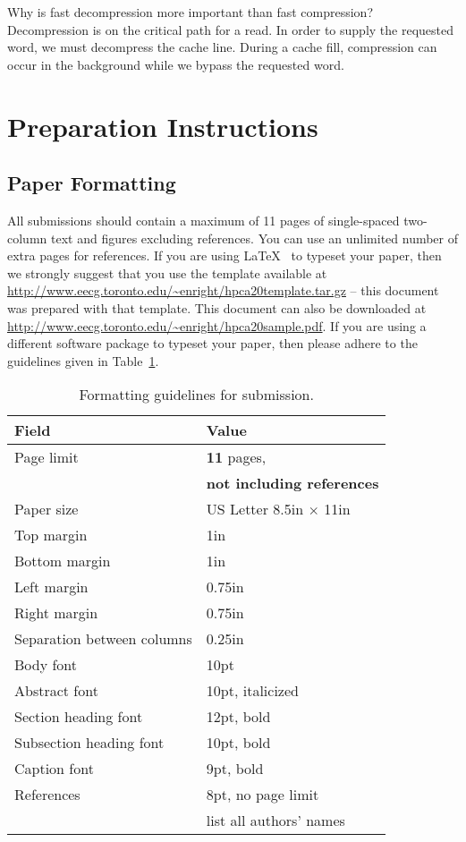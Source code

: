 \documentclass[pageno]{jpaper}
\begin{document}
Why is fast decompression more important than fast compression? Decompression is on the critical path for a read. In order to supply the requested word, we must decompress the cache line. During a cache fill, compression can occur in the background while we bypass the requested word.


\section{Preparation Instructions}

\subsection{Paper Formatting}

All submissions should contain a maximum of 11 pages of single-spaced
two-column text and figures excluding references. You can use an unlimited number of extra pages for references. 
If you are using \LaTeX~\cite{lamport94} 
to typeset your paper, then we 
strongly suggest
that you use the template available at
\url{http://www.eecg.toronto.edu/~enright/hpca20template.tar.gz} -- this
document was prepared with that template.  This document can
also be downloaded at \url{http://www.eecg.toronto.edu/~enright/hpca20sample.pdf}.
If you are using a different
software package to typeset your paper, then please adhere to the guidelines
given in Table~\ref{table:formatting}.

\begin{table}[h!]
  \centering
  \begin{tabular}{|l|l|}
    \hline
    \textbf{Field} & \textbf{Value}\\
    \hline
    \hline
    Page limit & {\bf 11} pages, \\
& {\bf not including references}\\
    \hline
    Paper size & US Letter 8.5in $\times$ 11in\\
    \hline
    Top margin & 1in\\
    \hline
    Bottom margin & 1in\\
    \hline
    Left margin & 0.75in\\
    \hline
    Right margin & 0.75in\\
    \hline
    Separation between columns & 0.25in\\
    \hline
    Body font & 10pt\\
    \hline
    Abstract font & 10pt, italicized\\
    \hline
    Section heading font & 12pt, bold\\
    \hline
    Subsection heading font & 10pt, bold\\
    \hline
    Caption font & 9pt, bold\\
    \hline
    References & 8pt, no page limit\\
& list all authors' names \\
    \hline
  \end{tabular}
  \caption{Formatting guidelines for submission.}
  \label{table:formatting}
\end{table}
\end{document}
